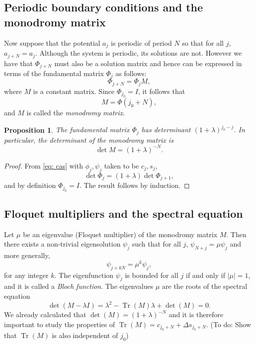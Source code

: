 \documentclass[11pt]{article}
\newtheorem{prop}{Proposition}
\theoremstyle{definition}
\DeclareMathOperator*{\Tr}{\mathrm{Tr}}
\begin{document}
\subsection{Periodic boundary conditions and the monodromy matrix}
Now suppose that the potential $a_{j}$ is periodic of period $N$ so that for all $j$, $a_{j+N}=a_{j}$. Although the system is periodic, its solutions are not. However we have that $\Phi_{j+N}$ must also be a solution matrix and hence can be expressed in terms of the fundamental matrix $\Phi_{j}$ as follows:
\begin{equation}
\Phi_{j+N}=\Phi_{j}M,
\end{equation}
where $M$ is a constant matrix. Since $\Phi_{j_0}=I$, it follows that
\begin{equation}
M=\Phi(j_0+N),
\end{equation}
and $M$ is called the \emph{monodromy matrix}.

\begin{prop}
The fundamental matrix $\Phi_{j}$ has determinant $(1+\lambda)^{j_0-j}$. In particular, the determinant of the monodromy matrix is
\begin{equation}
	\det M=(1+\lambda)^{-N}.
\end{equation}
\end{prop}
\begin{proof}
From \eqref{eq: cas} with $\phi_{j},\psi_{j}$ taken to be $c_{j},s_{j}$,
\begin{equation}
\det\Phi_{j}=(1+\lambda)\det\Phi_{j+1},
\end{equation}
and by definition $\Phi_{j_0}=I$. The result follows by induction. 
\end{proof}

\subsection{Floquet multipliers and the spectral equation}
Let $\mu$ be an eigenvalue (Floquet multiplier) of the monodromy matrix $M$. Then there exists a non-trivial eigensolution 
$\psi_j$ such that for all $j$, $\psi_{N+j} = \mu\psi_j$ and more generally,
\begin{equation}
\psi_{j+kN} = \mu^k\psi_j,	
\end{equation}
for any integer $k$. The eigenfunction $\psi_j$ is bounded for all $j$ if and only if $|\mu|=1$, and it is called a 
\emph{Bloch function}. The eigenvalues $\mu$ are the roots of the spectral equation
\begin{equation}
	\det(M - \lambda I) = \lambda^2 - \Tr(M)\lambda + \det(M) = 0.
\end{equation}
We already calculated that $\det(M)=(1+\lambda)^{-N}$ and it is therefore important to study the properties of $\Tr(M) = c_{j_0+N}+ \Delta s_{j_0+N}$. (To do: Show that $\Tr(M)$ is also independent of $j_0$)
\end{document}
